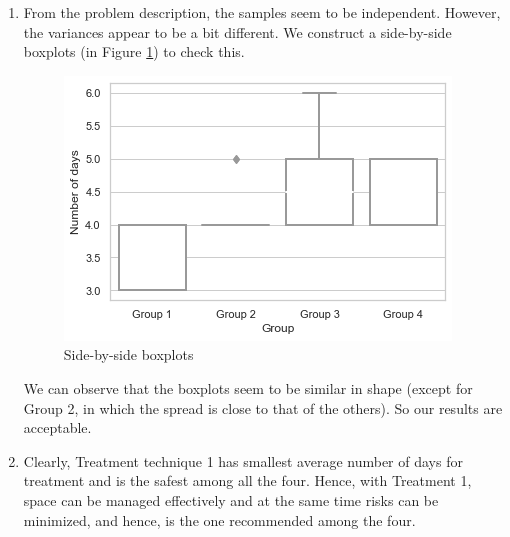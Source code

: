 \documentclass[12pt, oneside]{article}
\begin{document}
\begin{enumerate}
\begin{enumerate}
\begin{table}[h]
    \centering
    \begin{tabular}{|l|l|l||l|}
        \hline
         $SS_b=10.7375$ & $df_b=k-1=3$ & $MS_b=\frac{SS_b}{df_b} = 3.5791$ & $F_0 =  \frac{MS_b}{MS_w} $ \\
        \cline{1-3}
         $SS_w=17.75$ & $df_w=N-k=76$ & $MS_w=\frac{SS_w}{df_w} = 0.2335$ &  = $ 15.3249 $ \\
         \hline
    \end{tabular}
    \caption{ANOVA calculations}
    \label{tab:q3_anova_calc_fin}
\end{table}
 
From Table \ref{tab:q3_anova_calc_fin}, $F_0 = 15.3249$ and since $F_0 \ge F_{k-1,N-k,\alpha} = F_{3,76,0.01} = 4.05$, we reject the null hypothesis $H_0$, i.e., we can conclude that there exists an effect in treatment technique (in terms on average number of days required for treatment) at 1\% significance.

\item
From the problem description, the samples seem to be independent. However, the variances appear to be a bit different. We construct a side-by-side boxplots (in Figure \ref{fig:q3_box_plot}) to check this.

\begin{figure}[h]
    \centering
    \includegraphics{img/q3_box.png}
    \caption{Side-by-side boxplots}
    \label{fig:q3_box_plot}
\end{figure}

We can observe that the boxplots seem to be similar in shape (except for Group 2, in which the spread is close to that of the others). So our results are acceptable.
\item
Clearly, Treatment technique 1 has smallest average number of days for treatment and is the safest among all the four. Hence, with Treatment 1, space can be managed effectively and at the same time risks can be minimized, and hence, is the one recommended among the four.


\end{enumerate}
\end{enumerate}
\end{document}
